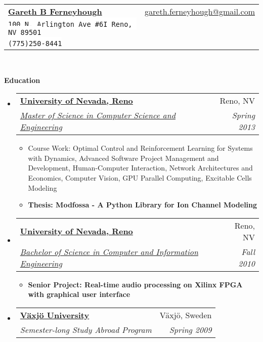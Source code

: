 \documentclass[letterpaper,11pt]{article}
\makeatletter
\newcommand{\resitem}[1]{\item #1 \vspace{-2pt}}
\newcommand{\resheading}[1]{{\large \colorbox{mygrey}{\begin{minipage}{\textwidth}{\textbf{#1 \vphantom{p\^{E}}}}\end{minipage}}}}
\newcommand{\ressubheading}[4]{
\begin{tabular*}{6.5in}{l@{\extracolsep{\fill}}r}
		\textbf{#1} & #2 \\
		\textit{#3} & \textit{#4} \\
\end{tabular*}\vspace{-6pt}}
\makeatother
\begin{document}
\newcommand{\mywebheader}{
\begin{tabular*}{7in}{l@{\extracolsep{\fill}}r}
	\textbf{\href{http://linkedin.com/in/gferneyhough}{\LARGE Gareth B Ferneyhough}} & \href{mailto:gareth.ferneyhough@gmail.com}{gareth.ferneyhough@gmail.com}\\
	{\footnotesize \texttt{\colorbox{white}{100 N. Arlington Ave \#6I Reno, NV 89501}}} &  \\
	{\footnotesize \texttt{\colorbox{white}{(775)250-8441}}}
	\end{tabular*}
\\
\vspace{0.1in}}

\mywebheader

\resheading{Education}
	\begin{itemize}
		\item
			\ressubheading{\href{http://www.unr.edu/}{University of Nevada, Reno}}{Reno, NV}{\href{http://www.cse.unr.edu/academics/graduate/cesms.html}{Master of Science in Computer Science and Engineering}}{Spring 2013}
				{ \footnotesize
				\begin{itemize}
				  \resitem{Course Work: Optimal Control and Reinforcement Learning for Systems with Dynamics, Advanced Software Project Management and Development, Human-Computer Interaction, Network Architectures and Economics, Computer Vision, GPU Parallel Computing, Excitable Cells Modeling}  
				  \resitem{\textbf{Thesis: Modfossa - A Python Library for Ion Channel Modeling}}
				\end{itemize}
				}
		\item
			\ressubheading{\href{http://www.unr.edu/}{University of Nevada, Reno}}{Reno, NV}{\href{http://www.cse.unr.edu/academics/undergraduate/ciebs.html}{Bachelor of Science in Computer and Information Engineering}}{Fall 2010}
				{ \footnotesize
				\begin{itemize}
				  \resitem{\textbf{Senior Project: Real-time audio processing on Xilinx FPGA with graphical user interface}}
				\end{itemize}
				}
		\item
			\ressubheading{\href{http://lnu.se/?l=en}{V\"{a}xj\"{o} University}}{V\"{a}xj\"{o}, Sweden}{Semester-long Study Abroad Program}{Spring 2009}
	\end{itemize} %
\end{document}
